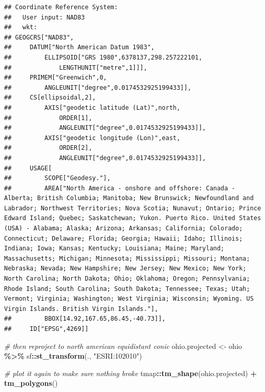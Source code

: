 \documentclass[]{article}
\newenvironment{Shaded}{\begin{snugshade}}{\end{snugshade}}
\newcommand{\CommentTok}[1]{\textcolor[rgb]{0.56,0.35,0.01}{\textit{#1}}}
\newcommand{\FunctionTok}[1]{\textcolor[rgb]{0.13,0.29,0.53}{\textbf{#1}}}
\newcommand{\NormalTok}[1]{#1}
\newcommand{\OtherTok}[1]{\textcolor[rgb]{0.56,0.35,0.01}{#1}}
\newcommand{\SpecialCharTok}[1]{\textcolor[rgb]{0.81,0.36,0.00}{\textbf{#1}}}
\newcommand{\StringTok}[1]{\textcolor[rgb]{0.31,0.60,0.02}{#1}}
\begin{document}
\begin{verbatim}
## Coordinate Reference System:
##   User input: NAD83 
##   wkt:
## GEOGCRS["NAD83",
##     DATUM["North American Datum 1983",
##         ELLIPSOID["GRS 1980",6378137,298.257222101,
##             LENGTHUNIT["metre",1]]],
##     PRIMEM["Greenwich",0,
##         ANGLEUNIT["degree",0.0174532925199433]],
##     CS[ellipsoidal,2],
##         AXIS["geodetic latitude (Lat)",north,
##             ORDER[1],
##             ANGLEUNIT["degree",0.0174532925199433]],
##         AXIS["geodetic longitude (Lon)",east,
##             ORDER[2],
##             ANGLEUNIT["degree",0.0174532925199433]],
##     USAGE[
##         SCOPE["Geodesy."],
##         AREA["North America - onshore and offshore: Canada - Alberta; British Columbia; Manitoba; New Brunswick; Newfoundland and Labrador; Northwest Territories; Nova Scotia; Nunavut; Ontario; Prince Edward Island; Quebec; Saskatchewan; Yukon. Puerto Rico. United States (USA) - Alabama; Alaska; Arizona; Arkansas; California; Colorado; Connecticut; Delaware; Florida; Georgia; Hawaii; Idaho; Illinois; Indiana; Iowa; Kansas; Kentucky; Louisiana; Maine; Maryland; Massachusetts; Michigan; Minnesota; Mississippi; Missouri; Montana; Nebraska; Nevada; New Hampshire; New Jersey; New Mexico; New York; North Carolina; North Dakota; Ohio; Oklahoma; Oregon; Pennsylvania; Rhode Island; South Carolina; South Dakota; Tennessee; Texas; Utah; Vermont; Virginia; Washington; West Virginia; Wisconsin; Wyoming. US Virgin Islands. British Virgin Islands."],
##         BBOX[14.92,167.65,86.45,-40.73]],
##     ID["EPSG",4269]]
\end{verbatim}

\begin{Shaded}
\begin{Highlighting}[]
\CommentTok{\# then reproject to north american equidistant conic}
\NormalTok{ohio.projected }\OtherTok{\textless{}{-}}\NormalTok{ ohio }\SpecialCharTok{\%\textgreater{}\%}\NormalTok{ sf}\SpecialCharTok{::}\FunctionTok{st\_transform}\NormalTok{(., }\StringTok{"ESRI:102010"}\NormalTok{)}

\CommentTok{\# plot it again to make sure nothing broke}
\NormalTok{tmap}\SpecialCharTok{::}\FunctionTok{tm\_shape}\NormalTok{(ohio.projected) }\SpecialCharTok{+} \FunctionTok{tm\_polygons}\NormalTok{()}
\end{Highlighting}
\end{Shaded}
\end{document}
